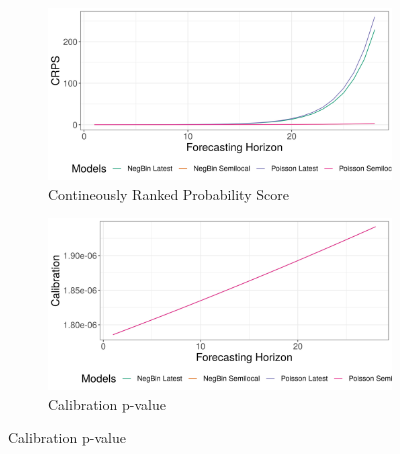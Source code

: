 \begin{figure}[H]
\begin{subfigure}{0.5\textwidth}
  \centering
  \includegraphics[width=\linewidth]{../output/Komanda_crps.png}  
  \caption{Contineously Ranked Probability Score}
  \label{fig:sub-first}
\end{subfigure}
\begin{subfigure}{0.5\textwidth}
  \centering
  \includegraphics[width=\linewidth]{../output/Komanda_calibration.png}  
  \caption{Calibration p-value}
  \label{fig:sub-second}
\end{subfigure}


\end{figure}

